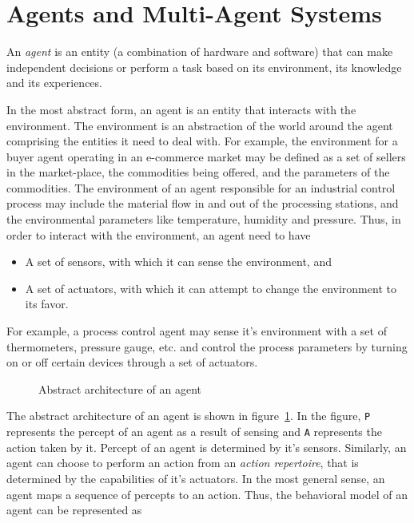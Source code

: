 \section{Agents and Multi-Agent Systems}

\begin{definition} [agent]
	An {\em agent} is an entity (a combination of hardware and software) that can make independent decisions or perform a task 
	based on its environment, its knowledge and its experiences. 
\end{definition}

In the most abstract form, an agent is an entity that interacts with the environment. The environment is an abstraction of the 
world around the agent comprising the entities it need to deal with. For example, the environment for a buyer agent operating 
in an e-commerce market may be defined as a set of sellers in the market-place, the commodities being offered, and the parameters 
of the commodities. The environment of an agent responsible for an industrial control process may include the material flow in 
and out of the processing stations, and the environmental parameters like temperature, humidity and pressure. 
%
Thus, in order to interact with the environment, an agent need to have 
 
\begin{itemize}
	\item A set of sensors, with which it can sense the environment, and 
	\item A set of actuators, with which it can attempt to change the environment to its favor. 
\end{itemize}

\noindent
For example, a process control agent may sense it's environment with a set of thermometers, pressure gauge, etc. and control
the process parameters by turning on or off certain devices through a set of actuators.

\begin{figure}[!htbp]
	\centering
\caption{Abstract architecture of an agent} 
\label{fig:agents:agent}
\end{figure}

The abstract architecture of an agent is shown in figure~\ref{fig:agents:agent}. In the figure, \texttt{P} represents the 
percept of an agent as a result of sensing and \texttt{A} represents the action taken by it. 
Percept of an agent is determined by it's sensors. Similarly, an agent can choose to perform an action from an {\em action 
repertoire}, that is determined by the capabilities of it's actuators. 
%
In the most general sense, an agent maps a sequence of percepts to an action. Thus, the behavioral model of an agent can be 
represented as

